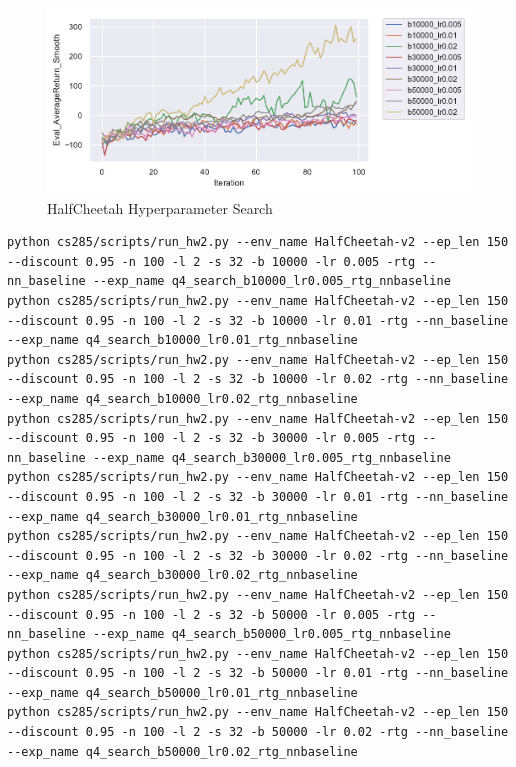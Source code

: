 \documentclass[letterpaper, 10pt]{article}
\begin{document}
\begin{figure}[h]
\centering
\includegraphics{figures/q4_search.pdf}
\caption{HalfCheetah Hyperparameter Search}
\end{figure}

\begin{lstlisting}[caption=Exact command line configurations]
python cs285/scripts/run_hw2.py --env_name HalfCheetah-v2 --ep_len 150 --discount 0.95 -n 100 -l 2 -s 32 -b 10000 -lr 0.005 -rtg --nn_baseline --exp_name q4_search_b10000_lr0.005_rtg_nnbaseline
python cs285/scripts/run_hw2.py --env_name HalfCheetah-v2 --ep_len 150 --discount 0.95 -n 100 -l 2 -s 32 -b 10000 -lr 0.01 -rtg --nn_baseline --exp_name q4_search_b10000_lr0.01_rtg_nnbaseline
python cs285/scripts/run_hw2.py --env_name HalfCheetah-v2 --ep_len 150 --discount 0.95 -n 100 -l 2 -s 32 -b 10000 -lr 0.02 -rtg --nn_baseline --exp_name q4_search_b10000_lr0.02_rtg_nnbaseline
python cs285/scripts/run_hw2.py --env_name HalfCheetah-v2 --ep_len 150 --discount 0.95 -n 100 -l 2 -s 32 -b 30000 -lr 0.005 -rtg --nn_baseline --exp_name q4_search_b30000_lr0.005_rtg_nnbaseline
python cs285/scripts/run_hw2.py --env_name HalfCheetah-v2 --ep_len 150 --discount 0.95 -n 100 -l 2 -s 32 -b 30000 -lr 0.01 -rtg --nn_baseline --exp_name q4_search_b30000_lr0.01_rtg_nnbaseline
python cs285/scripts/run_hw2.py --env_name HalfCheetah-v2 --ep_len 150 --discount 0.95 -n 100 -l 2 -s 32 -b 30000 -lr 0.02 -rtg --nn_baseline --exp_name q4_search_b30000_lr0.02_rtg_nnbaseline
python cs285/scripts/run_hw2.py --env_name HalfCheetah-v2 --ep_len 150 --discount 0.95 -n 100 -l 2 -s 32 -b 50000 -lr 0.005 -rtg --nn_baseline --exp_name q4_search_b50000_lr0.005_rtg_nnbaseline
python cs285/scripts/run_hw2.py --env_name HalfCheetah-v2 --ep_len 150 --discount 0.95 -n 100 -l 2 -s 32 -b 50000 -lr 0.01 -rtg --nn_baseline --exp_name q4_search_b50000_lr0.01_rtg_nnbaseline
python cs285/scripts/run_hw2.py --env_name HalfCheetah-v2 --ep_len 150 --discount 0.95 -n 100 -l 2 -s 32 -b 50000 -lr 0.02 -rtg --nn_baseline --exp_name q4_search_b50000_lr0.02_rtg_nnbaseline
\end{lstlisting}
\end{document}
